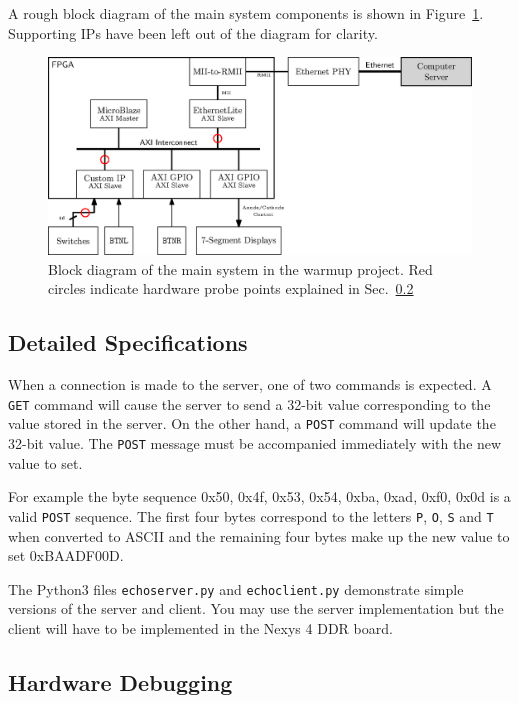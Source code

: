 \documentclass[11pt]{article}
\begin{document}
A rough block diagram of the main system components is shown in Figure~\ref{fig:blockdiag}.
Supporting IPs have been left out of the diagram for clarity.

\begin{figure}[!b]
\centering
\includegraphics{diag.eps}
\caption{Block diagram of the main system in the warmup project. Red circles indicate hardware probe points explained in Sec.~\ref{sec:wtd:hwdbg}}
\label{fig:blockdiag}
\end{figure}

\subsection{Detailed Specifications}

When a connection is made to the server, one of two commands is expected.
A \verb|GET| command will cause the server to send a 32-bit value corresponding to the value stored in the server.
On the other hand, a \verb|POST| command will update the 32-bit value.
The \verb|POST| message must be accompanied immediately with the new value to set.

For example the byte sequence 0x50, 0x4f, 0x53, 0x54, 0xba, 0xad, 0xf0, 0x0d is a valid \verb|POST| sequence.
The first four bytes correspond to the letters \verb|P|, \verb|O|, \verb|S| and \verb|T| when converted to ASCII and the remaining four bytes make up the new value to set 0xBAADF00D.

The Python3 files \verb|echoserver.py| and \verb|echoclient.py| demonstrate simple versions of the server and client.
You may use the server implementation but the client will have to be implemented in the Nexys 4 DDR board.

\subsection{Hardware Debugging}
\label{sec:wtd:hwdbg}
\end{document}
